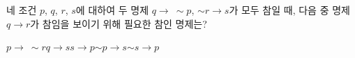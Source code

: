 네 조건 $p$, $q$, $r$, $s$에 대하여 두 명제 $q\longrightarrow\ \sim p$, $\sim r\longrightarrow s$가 모두 참일 때, 다음 중 명제 $q\longrightarrow r$가 참임을 보이기 위해 필요한 참인 명제는?
\begin{choices32}{$p\longrightarrow\ \sim r$}{$q\longrightarrow s$}{$s\longrightarrow p$}{$\sim p\longrightarrow s$}{$\sim s\longrightarrow p$}\end{choices32}
